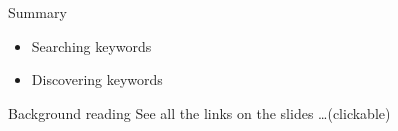 \documentclass[aspectratio=169,usenames,dvipsnames]{beamer}
\begin{document}
\begin{frame}{Summary}
    \begin{itemize}
        \item Searching keywords
        \item Discovering keywords
    \end{itemize}
\end{frame}


\begin{frame}{Background reading}
    See all the links on the slides \dots (clickable)
\end{frame}
\end{document}
